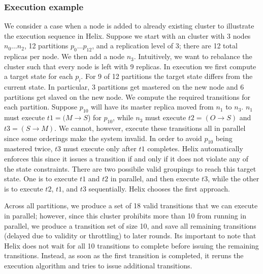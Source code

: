 
\subsubsection{Execution example}
%
We consider a case when a node is added to already existing
cluster to illustrate the execution sequence in Helix.
Suppose we start with an \ES cluster with 3 nodes $n_0 \ldots n_2$, 12
partitions $p_0 \ldots p_{12}$, and a replication level of 3; there are 12 total
replicas per node.  We then add a node $n_3$. 
Intuitively, we want to rebalance the cluster such that every node is left with
9 replicas.  In \helix execution we first compute a target state for each
$p_i$.  For 9 of 12 partitions the target state differs from the current state.  In
particular, 3 partitions get mastered on the new node and 6 partitions get
slaved on the new node.  We compute the required transitions for each partition.
Suppose $p_{10}$ will have its master replica moved from $n_1$ to $n_3$.  $n_1$
must execute $t1=(M \rightarrow S$) for $p_{10}$, while $n_3$ must execute $t2=(O
\rightarrow S)$ and $t3=(S \rightarrow M)$.  We cannot, however, execute these
transitions all in parallel since some orderings make the system invalid.
In order to avoid $p_{10}$ being mastered twice, $t3$ must execute only after
$t1$ completes. Helix automatically enforces this since it
issues a transition if and only if it does not violate any of the
state constraints. There are two possibile valid groupings to reach this target
state. One is to execute $t1$ and $t2$ in
parallel, and then execute $t3$, while the other is to execute $t2$, $t1$, and $t3$
sequentially. Helix chooses
the first approach.
 
Across all partitions, we produce
a set of 18 valid transitions that we can execute in parallel; however, since 
this \ES cluster prohibits more than 10 from running in parallel, 
we produce a transition set of size 10, and save all remaining transitions
(delayed due to validity or throttling) to later rounds. Its important to note that
Helix does not wait for all 10 transitions to complete before issuing the
remaining transitions. Instead, as soon as the first transition is completed, it
reruns the execution algorithm and tries to issue additional transitions. 





